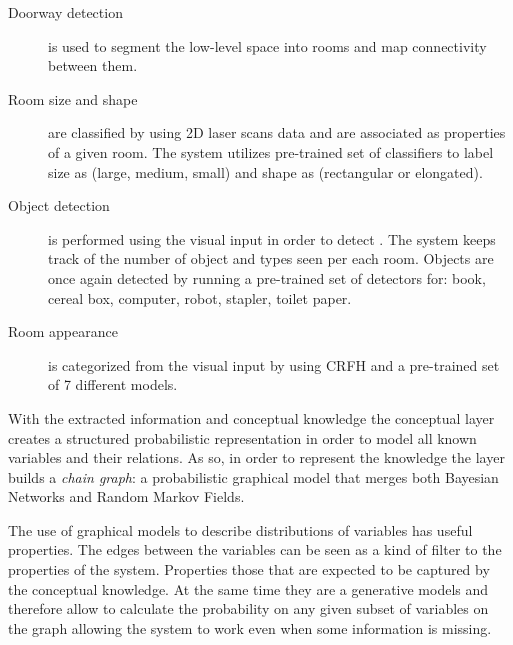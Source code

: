 \documentclass[runningheads,a4paper]{llncs}
\begin{document}
\begin{description}
 \item[Doorway detection] is used to segment the low-level space into rooms and map connectivity between them.
 \item[Room size and shape] are classified by using 2D laser scans data and are associated as properties of a given room. The system utilizes pre-trained set of classifiers to label size as (large, medium, small) and shape as (rectangular or elongated).
 \item[Object detection] is performed using the visual input in order to detect . The system keeps track of the number of object and types seen per each room. Objects are once again detected by running a pre-trained set of detectors for: book, cereal box, computer, robot, stapler, toilet paper.
 \item[Room appearance] is categorized from the visual input by using CRFH and a pre-trained set of 7 different models.
\end{description}

With the extracted information and conceptual knowledge the conceptual layer creates a structured probabilistic representation
in order to model all known variables and their relations.
As so, in order to represent the knowledge the layer builds a \emph{chain graph}:
a probabilistic graphical model that merges both Bayesian Networks and Random Markov Fields.

The use of graphical models to describe distributions of variables has useful properties.
The edges between the variables can be seen as a kind of filter to the properties of the system.
Properties those that are expected to be captured by the conceptual knowledge.
At the same time they are a generative models and therefore allow to calculate the probability
on any given subset of variables on the graph allowing the system to work even when some
information is missing.
\end{document}
